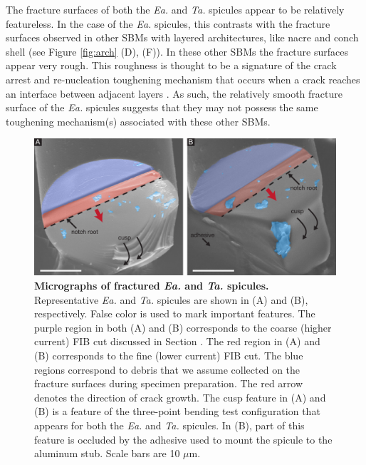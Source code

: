 \documentclass[12pt,onecolumn]{article}
\makeatletter
\DeclareRobustCommand*{\nameref}[1]{%
      \emph{\myorg@nameref{#1}}%
    }%
\newcommand{\TA}{\textit{Ta.\@}\xspace}
\newcommand{\EA}{\textit{Ea.\@}\xspace}
\makeatother
\begin{document}
\begin{bibunit}
 The fracture surfaces of both the \EA and \TA spicules appear to be relatively featureless. In the case of the \EA spicules, this contrasts with the fracture surfaces observed in other SBMs with layered architectures, like nacre and conch shell (see Figure \ref{fig:arch} (D), (F)). In these other SBMs the fracture surfaces appear very rough. This roughness is thought to be a signature of the crack arrest and re-nucleation toughening mechanism that occurs when a crack reaches an interface between adjacent layers \cite{karambelas2013strombus, koester2008true,liu2000bending,barthelat2009review}. 
 As such, the relatively smooth fracture surface of the \EA spicules suggests that they may not possess the same toughening mechanism(s) associated with these other SBMs.
%
\begin{figure}[hb!]
			\centering
			\includegraphics[width=\textwidth]{../Figures/FigureFract/Figure4_V5.pdf}
			\caption{\textbf{Micrographs of fractured \EA and \TA spicules.} Representative \EA and \TA spicules are shown in (A) and (B), respectively. False color is used to mark important features. The purple region in both (A) and (B) corresponds to the coarse (higher current) FIB cut discussed in Section \nameref{sec:notchconfig}. The red region in (A) and (B) corresponds to the fine (lower current) FIB cut. The blue regions correspond to debris that we assume collected on the fracture surfaces during specimen preparation. The red arrow denotes the direction of crack growth. The cusp feature in (A) and (B) is a feature of the three-point bending test configuration that appears for both the \EA and \TA spicules. In (B), part of this feature is occluded by the adhesive used to mount the spicule to the aluminum stub. Scale bars are 10 $\mu$m.}
			\label{fig:fract}
			\end{figure}


\end{bibunit}
\end{document}
